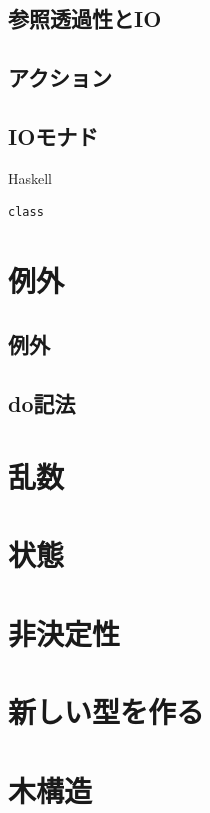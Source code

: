 \documentclass[a4paper]{jsbook}
\newcommand{\programminglanguage}[1]{\textsf{#1}}
\newcommand{\haskell}{\programminglanguage{Haskell}}
\newenvironment{haskellcode}{\begin{itembox}[r]{\haskell}}{\end{itembox}}
\begin{document}
\section{参照透過性とIO}

\section{アクション}

\section{IOモナド}

\begin{haskellcode}
\begin{verbatim}
class
\end{verbatim}
\end{haskellcode}


\chapter{例外}

\section{例外}

\section{do記法}

\chapter{乱数}

\chapter{状態}

\chapter{非決定性}

\chapter{新しい型を作る}

\chapter{木構造}
\end{document}
